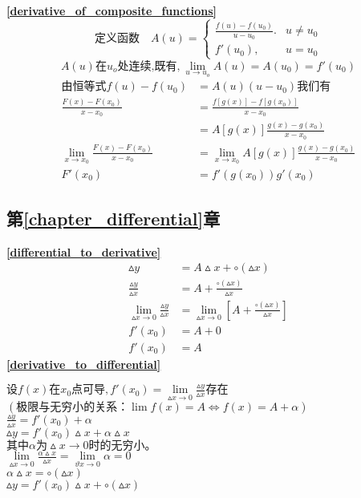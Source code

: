 \textbf{\large \ref{derivative_of_composite_functions}}
$$        \mbox{定义函数}\quad A(u)=\begin{cases}
    \frac{f(u)-f(u_0)}{u-u_0}. &u\neq u_0\\
    f'(u_0),&u= u_0
\end{cases}$$
$$A(u)\mbox{在}u_o\mbox{处连续,既有,}\ \lim\limits_{u\to u_o}A(u)=A(u_0)=f'(u_0)$$
\begin{align*}
        \mbox{由恒等式}f(u)-f(u_0)&=A(u)(u-u_0)\mbox{我们有}\\
        \frac{F(x)-F(x_0)}{x-x_0}&=\frac{f\left[g(x)\right]-f\left[g(x_0)\right]}{x-x_0}\\
        &=A\left[g(x)\right]\frac{g(x)-g(x_0)}{x-x_0}\\
        \lim\limits_{x\to x_0}\frac{F(x)-F(x_0)}{x-x_0}&=\lim\limits_{x\to x_0}A\left[g(x)\right]\frac{g(x)-g(x_0)}{x-x_0}\\
        F'(x_0)&=f'(g(x_0))g'(x_0)
\end{align*}

\subsection{\centering 第\ref{chapter_differential}章}
\textbf{\large \ref{differential_to_derivative}}
\begin{align*}
            \vartriangle y&=A\vartriangle x+\circ(\vartriangle x)\\
            \frac{\vartriangle y}{\vartriangle x}&=A+\frac{\circ(\vartriangle x)}{\vartriangle x}\\
            \lim\limits_{\vartriangle x\to 0}\frac{\vartriangle y}{\vartriangle x}&=\lim\limits_{\vartriangle x\to 0}\left[A+\frac{\circ(\vartriangle x)}{\vartriangle x}\right]\\
            f'(x_0)&=A+0\\
            f'(x_0)&=A
\end{align*}
\textbf{\large \ref{derivative_to_differential}}
\begin{center}
            $\mbox{设}f(x)\mbox{在}x_0\mbox{点可导},f'(x_0)=\lim\limits_{\vartriangle x \to 0}\frac{\vartriangle y}{\vartriangle x}\mbox{存在}$\\
            $\left(\mbox{极限与无穷小的关系：}\lim f(x)=A\Leftrightarrow f(x)=A+\alpha\right)$\\
            $\frac{\vartriangle y}{\vartriangle x}=f'(x_0)+\alpha$\\
            $\vartriangle y=f'(x_0)\vartriangle x+\alpha \vartriangle x$\\
            $\mbox{其中}\alpha \mbox{为}\vartriangle x\to 0\mbox{时的无穷小。}$\\
            $\lim\limits_{\vartriangle x\to 0}\frac{\alpha \vartriangle x}{\vartriangle x}=\lim\limits_{\vartheta x\to 0}\alpha = 0$\\
            $\alpha \vartriangle x=\circ(\vartriangle x)$\\
            $\vartriangle y=f'(x_0)\vartriangle x+\circ(\vartriangle x)$
\end{center}

